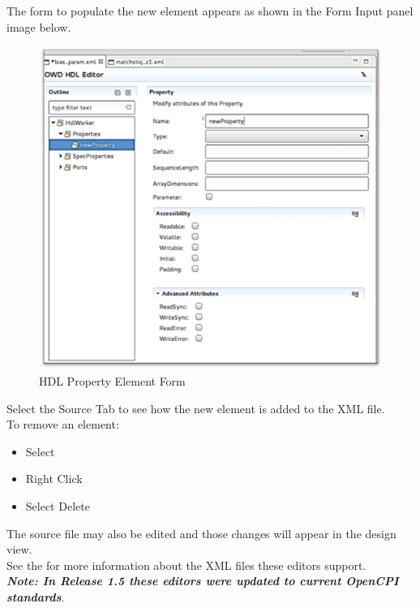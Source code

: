 \documentclass[10pt, a4paper, oneside]{article}
\begin{document}
The form to populate the new element appears as shown in the Form Input panel image below.\\
\begin{figure}[h!]
	\centering
	\caption{HDL Property Element Form}\label{fig:HDLPropertyElementForm}
	\includegraphics[width=.95\textwidth]{HDLPropertyElementForm.png}
 \end{figure}

Select the Source Tab to see how the new element is added to the XML file. \\
To remove an element:
\begin{itemize}
\item Select
\item Right Click
\item Select Delete
\end{itemize}
The source file may also be edited and those changes will appear in the design view.\\

See the  for more information about the XML files these editors support. \\

\textbf{\emph{Note: In Release 1.5 these editors were updated to current OpenCPI standards}}.\\
\end{document}
